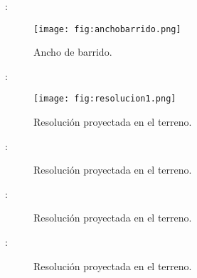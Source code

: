 \begin{frame}{\secname : \subsecname}
  \begin{figure}
    \centering
    \texttt{[image: fig:anchobarrido.png]}
    \caption{Ancho de barrido.}
    \label{}
  \end{figure}
\end{frame}

\begin{frame}{\secname : \subsecname}
  \begin{figure}
    \centering
    \texttt{[image: fig:resolucion1.png]}
    \caption{Resolución proyectada en el terreno.}
    \label{}
  \end{figure}
\end{frame}




\begin{frame}{\secname : \subsecname}
  \begin{figure}
    \centering
    \caption{Resolución proyectada en el terreno.}
    \label{}
  \end{figure}
\end{frame}

\begin{frame}{\secname : \subsecname}
  \begin{figure}
    \centering
    \caption{Resolución proyectada en el terreno.}
    \label{}
  \end{figure}
\end{frame}

\begin{frame}{\secname : \subsecname}
  \begin{figure}
    \centering
    \caption{Resolución proyectada en el terreno.}
    \label{}
  \end{figure}
\end{frame}


